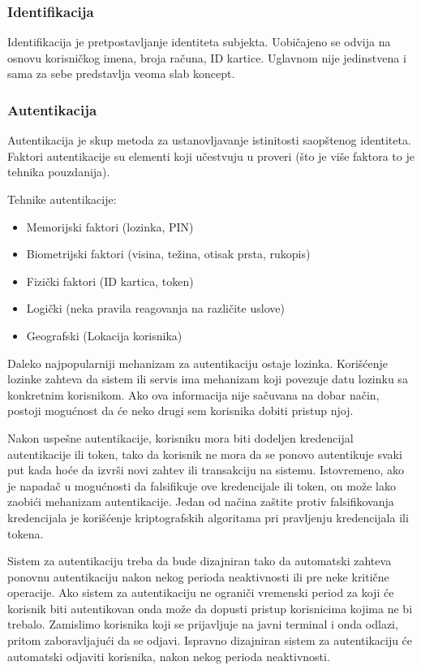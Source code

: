 \documentclass[a4paper]{article}
\begin{document}
\subsubsection{Identifikacija}
Identifikacija je pretpostavljanje identiteta subjekta. Uobičajeno se odvija na osnovu korisničkog imena, broja računa, ID kartice. Uglavnom nije jedinstvena i sama za sebe predstavlja veoma slab koncept.

\subsubsection{Autentikacija}
Autentikacija je skup metoda za ustanovljavanje istinitosti saopštenog identiteta. Faktori autentikacije su elementi koji učestvuju u proveri (što je više faktora to je tehnika pouzdanija).

Tehnike autentikacije: 
    \begin{itemize}
        \item Memorijski faktori (lozinka, PIN)
        \item  Biometrijski faktori (visina, težina, otisak prsta, rukopis)
        \item Fizički faktori (ID kartica, token)
        \item Logički (neka pravila reagovanja na različite uslove)                                    
        \item Geografski (Lokacija korisnika)                                
    \end{itemize}

Daleko najpopularniji mehanizam za autentikaciju ostaje lozinka. Korišćenje lozinke zahteva da sistem ili servis 
ima mehanizam koji povezuje datu lozinku sa konkretnim korisnikom. Ako ova informacija nije sačuvana na dobar 
način, postoji mogućnost da će neko drugi sem korisnika dobiti pristup njoj.

Nakon uspešne autentikacije, korisniku mora biti 
dodeljen kredencijal autentikacije ili token, tako da korisnik 
ne mora da se ponovo autentikuje svaki put kada hoće da izvrši novi zahtev ili transakciju na sistemu. 
Istovremeno, ako je napadač u mogućnosti da falsifikuje ove kredencijale ili token, on može lako zaobići 
mehanizam autentikacije. Jedan od načina zaštite protiv falsifikovanja kredencijala je korišćenje 
kriptografskih algoritama pri pravljenju kredencijala ili tokena.


Sistem za autentikaciju treba da bude dizajniran tako da automatski zahteva ponovnu autentikaciju nakon nekog 
perioda neaktivnosti ili pre neke kritične operacije.
Ako sistem za autentikaciju ne ograniči vremenski period za koji će korisnik biti autentikovan onda može 
da dopusti pristup korisnicima kojima ne bi trebalo. Zamislimo korisnika koji se prijavljuje na javni terminal
i onda odlazi, pritom zaboravljajući da se odjavi. Ispravno dizajniran sistem za autentikaciju 
će automatski odjaviti korisnika, nakon nekog perioda neaktivnosti.
\end{document}
